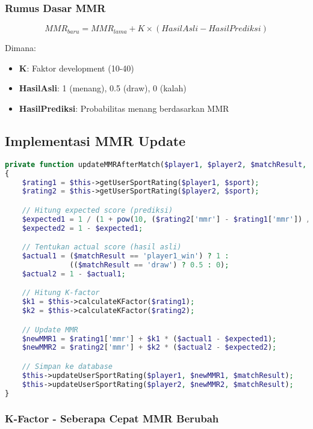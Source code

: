 \documentclass[12pt]{article}
\begin{document}
\subsubsection{Rumus Dasar MMR}

\begin{equation}
MMR_{baru} = MMR_{lama} + K \times (HasilAsli - HasilPrediksi)
\end{equation}

Dimana:
\begin{itemize}
    \item \textbf{K}: Faktor development (10-40)
    \item \textbf{HasilAsli}: 1 (menang), 0.5 (draw), 0 (kalah)
    \item \textbf{HasilPrediksi}: Probabilitas menang berdasarkan MMR
\end{itemize}

\subsection{Implementasi MMR Update}

\begin{lstlisting}[language=PHP, caption=Update MMR After Match di MatchmakingService.php]
private function updateMMRAfterMatch($player1, $player2, $matchResult, $sport)
{
    $rating1 = $this->getUserSportRating($player1, $sport);
    $rating2 = $this->getUserSportRating($player2, $sport);

    // Hitung expected score (prediksi)
    $expected1 = 1 / (1 + pow(10, ($rating2['mmr'] - $rating1['mmr']) / 400));
    $expected2 = 1 - $expected1;

    // Tentukan actual score (hasil asli)
    $actual1 = ($matchResult == 'player1_win') ? 1 : 
               (($matchResult == 'draw') ? 0.5 : 0);
    $actual2 = 1 - $actual1;

    // Hitung K-factor
    $k1 = $this->calculateKFactor($rating1);
    $k2 = $this->calculateKFactor($rating2);

    // Update MMR
    $newMMR1 = $rating1['mmr'] + $k1 * ($actual1 - $expected1);
    $newMMR2 = $rating2['mmr'] + $k2 * ($actual2 - $expected2);

    // Simpan ke database
    $this->updateUserSportRating($player1, $newMMR1, $matchResult);
    $this->updateUserSportRating($player2, $newMMR2, $matchResult);
}
\end{lstlisting}

\subsubsection{K-Factor - Seberapa Cepat MMR Berubah}
\end{document}
